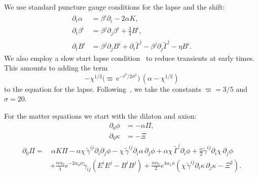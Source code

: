 We use standard puncture gauge conditions for the lapse and the shift:
\begin{align}
\partial_t\alpha &=\beta^i \partial_i - 2\alpha K , \\[4pt]
\partial_t \beta^i &= \beta^j \partial_j \beta^i + \tfrac{3}{4} B^i , \\[4pt] 
\partial_t B^i &= \beta^j \partial_j B^i + \partial_t {\tilde\Gamma}^i - \beta^j \partial_j {\tilde \Gamma}^i - \eta B^i .
\end{align}
We also employ a slow start lapse condition~\cite{Etienne2024} to reduce transients at early times.  This amounts to adding the term 
\begin{equation}
- \chi^{1/2} \bigl(\varpi \, e^{-t^2/2\sigma^2}\bigr)\,(\alpha - \chi^{1/2})
\end{equation}
to the equation for the lapse.  Following~\cite{Etienne2024}, we take the constants $\varpi=3/5$ and $\sigma=20$.

For the matter equations we start with the dilaton and axion:
\begin{align}
    \partial_0 \phi &= - \alpha \Pi , \\
    \partial_0 \kappa &= - \Xi 
\end{align}
\begin{equation}
\begin{aligned}
\partial_0 \Pi
=& \, \alpha K \Pi
- \alpha \chi\, \tilde{\gamma}^{ij} \partial_i \partial_j \phi
- \chi\, \tilde{\gamma}^{ij} \partial_i \alpha\, \partial_j \phi 
+ \alpha \chi\, \tilde{\Gamma}^i \partial_i \phi
+ \frac{\alpha}{2}\tilde{\gamma}^{ij}
  \partial_i \chi\, \partial_j \phi \\
&+ \frac{\alpha\alpha_0}{\chi}
  e^{-2\alpha_0\phi}
  \tilde{\gamma}_{ij}
  \left(E^iE^j - B^iB^j\right) + \frac{\alpha\alpha_1}{2}
  e^{4\alpha_1\phi}
  \left(
    \chi\,\tilde{\gamma}^{ij}
    \partial_i\kappa\,\partial_j\kappa
    - \Xi^2
  \right).
\end{aligned}
\end{equation}



